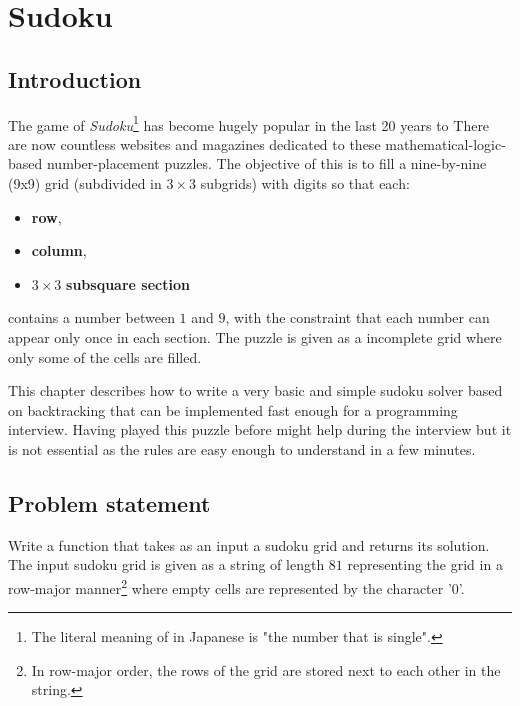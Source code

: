 %

\chapter{Sudoku}
\label{ch:sudoku}
\section*{Introduction}
The game of \textit{Sudoku}\footnote{The literal meaning of  in Japanese is "the number
that is single".} has become hugely popular in the last 20 years to There are now countless websites and magazines dedicated to these mathematical-logic-based
number-placement puzzles.  The objective of this is to fill a nine-by-nine (9x9) grid (subdivided in
$3\times3$ subgrids) with digits so that each:
\begin{itemize}[]
	\item \textbf{row},
	\item \textbf{column},
	\item $3\times3$ \textbf{subsquare section}
\end{itemize}
contains a number between $1$ and $9$, with the constraint that each number can appear only once in
each section. The puzzle is given as a incomplete grid where only some of the cells are filled.

This chapter describes how to write a very basic and simple sudoku solver based on backtracking that
can be implemented fast enough for a programming interview. Having played this puzzle before
might help during the interview but it is not essential as the rules are easy enough to
understand in a few minutes.


\section{Problem statement}
\begin{exercise}
Write a function that takes as an input a sudoku grid and returns its solution. The input sudoku
grid is given as a string of length $81$ representing the grid in a row-major manner\footnote{In
row-major order, the rows of the grid are stored next to each other in the string.} where empty
cells are represented by the character '0'.
\end{exercise}


